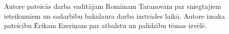 ﻿Autore pateicās darba vadītājam Romānam Taranovam par sniegtajiem ieteikumiem un sadarbību bakalaura darba izstrādes laikā.
Autore izsaka pateicību Ērikam Ezeriņam par atbalstu un  palīdzību tēmas izvēlē.